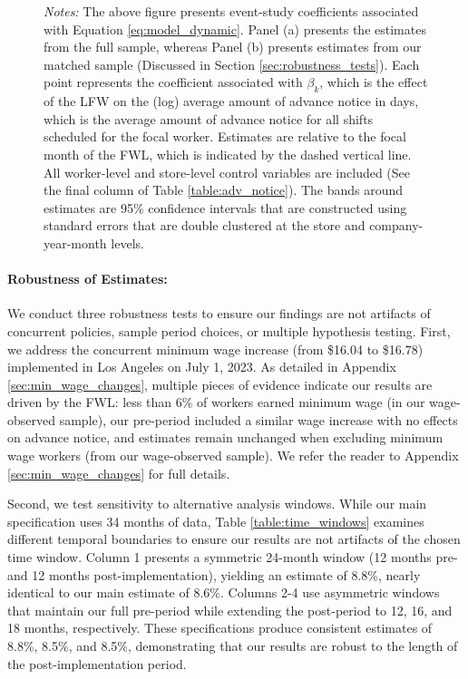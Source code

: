 \documentclass[letterpaper,11pt,leqno]{article}
\theoremstyle{paper}
\newcommand{\note}[2][]{\parbox{\textwidth}{\footnotesize\vspace*{10pt}\textit{#1}#2}}
\begin{document}
\begin{figure}[h]
\note{\scriptsize \singlespacing \textit{Notes:} The above figure presents event-study coefficients associated with Equation \ref{eq:model_dynamic}. Panel (a) presents the estimates from the full sample, whereas Panel (b) presents estimates from our matched sample (Discussed in Section \ref{sec:robustness_tests}). Each point represents the coefficient associated with $\beta_{k}$, which is the effect of the LFW on the (log) average amount of advance notice in days, which is the average amount of advance notice for all shifts scheduled for the focal worker. Estimates are relative to the focal month of the FWL, which is indicated by the dashed vertical line. All worker-level and store-level control variables are included (See the final column of Table \ref{table:adv_notice}). The bands around estimates are 95\% confidence intervals that are constructed using standard errors that are double clustered at the store and company-year-month levels.}
\label{f:event_study_workers}
\end{figure}

\paragraph{Robustness of Estimates:}
We conduct three robustness tests to ensure our findings are not artifacts of concurrent policies, sample period choices, or multiple hypothesis testing. First, we address the concurrent minimum wage increase (from \$16.04 to \$16.78) implemented in Los Angeles on July 1, 2023. As detailed in Appendix \ref{sec:min_wage_changes}, multiple pieces of evidence indicate our results are driven by the FWL: less than 6\% of workers earned minimum wage (in our wage-observed sample), our pre-period included a similar wage increase with no effects on advance notice, and estimates remain unchanged when excluding minimum wage workers (from our wage-observed sample). We refer the reader to Appendix \ref{sec:min_wage_changes} for full details.

Second, we test sensitivity to alternative analysis windows. While our main specification uses 34 months of data, Table \ref{table:time_windows} examines different temporal boundaries to ensure our results are not artifacts of the chosen time window. Column 1 presents a symmetric 24-month window (12 months pre- and 12 months post-implementation), yielding an estimate of 8.8\%, nearly identical to our main estimate of 8.6\%. Columns 2-4 use asymmetric windows that maintain our full pre-period while extending the post-period to 12, 16, and 18 months, respectively. These specifications produce consistent estimates of 8.8\%, 8.5\%, and 8.5\%, demonstrating that our results are robust to the length of the post-implementation period.
\end{document}
